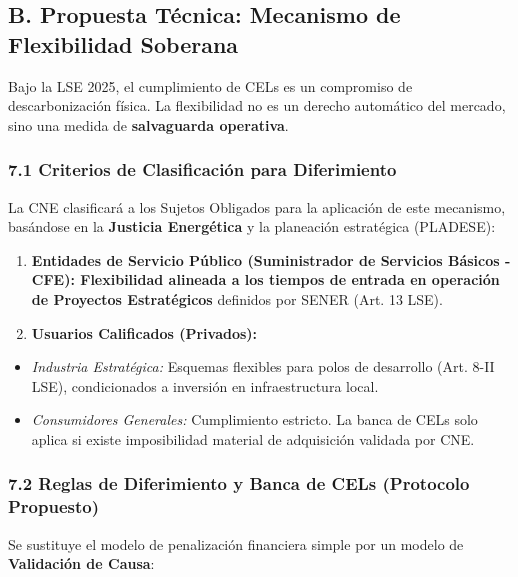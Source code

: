 \documentclass{cel}
\begin{document}
\subsection{B. Propuesta Técnica: Mecanismo de Flexibilidad Soberana}
\nopagebreak

Bajo la LSE 2025, el cumplimiento de CELs es un compromiso de descarbonización física. La flexibilidad no es un derecho automático del mercado, sino una medida de \textbf{salvaguarda operativa}.


\subsubsection{7.1 Criterios de Clasificación para Diferimiento}
\nopagebreak

La CNE clasificará a los Sujetos Obligados para la aplicación de este mecanismo, basándose en la \textbf{Justicia Energética} y la planeación estratégica (PLADESE):


\begin{enumerate}
\item \textbf{Entidades de Servicio Público (Suministrador de Servicios Básicos - CFE): \textbf{ Flexibilidad alineada a los tiempos de entrada en operación de }Proyectos Estratégicos} definidos por SENER (Art. 13 LSE).
\item \textbf{Usuarios Calificados (Privados):}
\end{enumerate}
\begin{itemize}
\item \textit{Industria Estratégica:} Esquemas flexibles para polos de desarrollo (Art. 8-II LSE), condicionados a inversión en infraestructura local.
\item \textit{Consumidores Generales:} Cumplimiento estricto. La \textquotedbl{}banca\textquotedbl{} de CELs solo aplica si existe imposibilidad material de adquisición validada por CNE.

\end{itemize}
\subsubsection{7.2 Reglas de Diferimiento y \textquotedbl{}Banca\textquotedbl{} de CELs (Protocolo Propuesto)}
\nopagebreak

Se sustituye el modelo de penalización financiera simple por un modelo de \textbf{Validación de Causa}:
\end{document}
